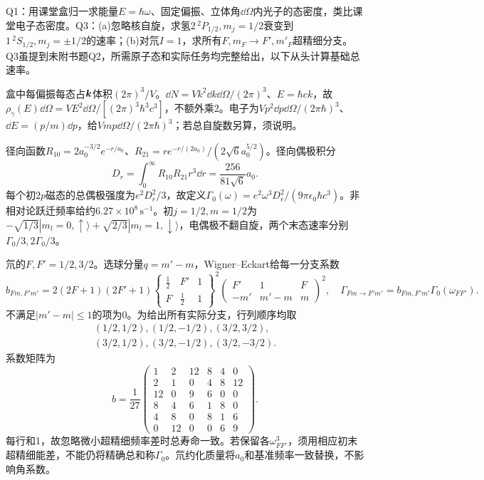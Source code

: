\begin{exercise}
Q1：用课堂盒归一求能量$E=\hbar\omega$、固定偏振、立体角$\dd\Omega$内光子的态密度，类比课堂电子态密度。Q3：(a)忽略核自旋，求氢$2\,{}^2P_{1/2},m_j=1/2$衰变到$1\,{}^2S_{1/2},m_j=\pm1/2$的速率；(b)对氘$I=1$，求所有$F,m_F\to F',m'_F$超精细分支。Q3虽提到未附书题Q2，所需原子态和实际任务均完整给出，以下从头计算基础总速率。
\end{exercise}
\begin{solution}
盒中每偏振每态占$\boldsymbol{k}$体积$(2\pi)^3/V$。$\dd N=Vk^2\dd k\dd\Omega/(2\pi)^3$、$E=\hbar ck$，故$\rho_\gamma(E)\dd\Omega=VE^2\dd\Omega/[(2\pi)^3\hbar^3c^3]$，不额外乘2。电子为$Vp^2\dd p\dd\Omega/(2\pi\hbar)^3$、$\dd E=(p/m)\dd p$，给$Vm p\dd\Omega/(2\pi\hbar)^3$；若总自旋数另算，须说明。

径向函数$R_{10}=2a_0^{-3/2}e^{-r/a_0}$、$R_{21}=r e^{-r/(2a_0)}/(2\sqrt6a_0^{5/2})$。径向偶极积分
\[
 D_r=\int_0^\infty R_{10}R_{21}r^3\dd r
 =\frac{256}{81\sqrt6}a_0.
\]
每个初$2p$磁态的总偶极强度为$e^2D_r^2/3$，故定义$\Gamma_0(\omega)=e^2\omega^3D_r^2/(9\pi\epsilon_0\hbar c^3)$。非相对论跃迁频率给约$6.27\times10^8\,\mathrm{s}^{-1}$。初$j=1/2,m=1/2$为$-\sqrt{1/3}|m_l=0,\uparrow\rangle+\sqrt{2/3}|m_l=1,\downarrow\rangle$，电偶极不翻自旋，两个末态速率分别$\Gamma_0/3,2\Gamma_0/3$。

氘的$F,F'=1/2,3/2$。选球分量$q=m'-m$，Wigner--Eckart给每一分支系数
\[
 b_{Fm,F'm'}=2(2F+1)(2F'+1)
 \begin{Bmatrix}\tfrac12&F'&1\\F&\tfrac12&1\end{Bmatrix}^{\!2}
 \begin{pmatrix}F'&1&F\\-m'&m'-m&m\end{pmatrix}^{\!2},\quad
 \Gamma_{Fm\to F'm'}=b_{Fm,F'm'}\Gamma_0(\omega_{FF'}).
\]
不满足$|m'-m|\le1$的项为0。为给出所有实际分支，行列顺序均取
\[\begin{gathered}(1/2,1/2),(1/2,-1/2),(3/2,3/2),\\(3/2,1/2),(3/2,-1/2),(3/2,-3/2).\end{gathered}\]
系数矩阵为
\[
 b=\frac1{27}\begin{pmatrix}
 1&2&12&8&4&0\\2&1&0&4&8&12\\
 12&0&9&6&0&0\\8&4&6&1&8&0\\
 4&8&0&8&1&6\\0&12&0&0&6&9
 \end{pmatrix}.
\]
每行和1，故忽略微小超精细频率差时总寿命一致。若保留各$\omega_{FF'}^3$，须用相应初末超精细能差，不能仍将精确总和称$\Gamma_0$。氘约化质量将$a_0$和基准频率一致替换，不影响角系数。
\end{solution}

